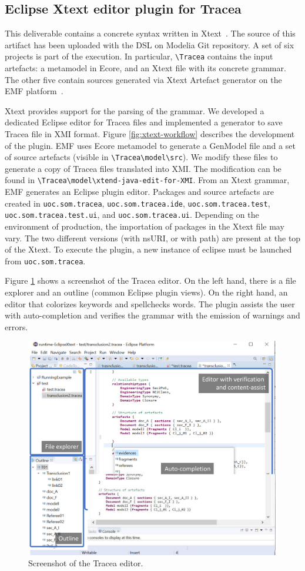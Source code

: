 \subsection{Eclipse Xtext editor plugin for Tracea}
This deliverable contains a concrete syntax written in Xtext~\cite{xtext}. The source of this artifact has been uploaded with the DSL on Modelia Git repository. 
A set of six projects is part of the execution. In particular, \verb|\Tracea| contains the input artefacts: a metamodel in Ecore, and an Xtext file with its concrete grammar. The other five contain sources generated via Xtext Artefact generator on the EMF platform~\cite{EMF}. 

Xtext provides support for the parsing of the grammar. We developed a dedicated Eclipse editor for Tracea files and implemented a generator to save Tracea file in XMI format. 
Figure \ref{fig:xtext-workflow} describes the development of the plugin. EMF uses Ecore metamodel to generate a GenModel file and a set of source artefacts (visible in \verb|\Tracea\model\src|). We modify these files to generate a copy of Tracea files translated into XMI. The modification can be found in \verb|\Tracea\model\xtend-java-edit-for-XMI|. 
From an Xtext grammar, EMF generates an Eclipse plugin editor. Packages and source artefacts are created in \verb|uoc.som.tracea|, \verb|uoc.som.tracea.ide|, \verb|uoc.som.tracea.test|, \verb|uoc.som.tracea.test.ui|, and \verb|uoc.som.tracea.ui|. Depending on the environment of production, the importation of packages in the Xtext file may vary. The two different versions (with nsURI, or with path) are present at the top of the Xtext. To execute the plugin, a new instance of eclipse must be launched from \verb|uoc.som.tracea|. 

Figure \ref{fig:plugin} shows a screenshot of the Tracea editor. On the left hand, there is a file explorer and an outline (common Eclipse plugin views). On the right hand, an editor that colorizes keywords and spellchecks words. The plugin assists the user with auto-completion and verifies the grammar with the emission of warnings and errors.


\begin{figure}[ht] 
	\centering 
	\includegraphics[width=.99\linewidth]{images/plugin-screenshot}
	\caption{Screenshot of the Tracea editor.}
	\label{fig:plugin}
\end{figure}
